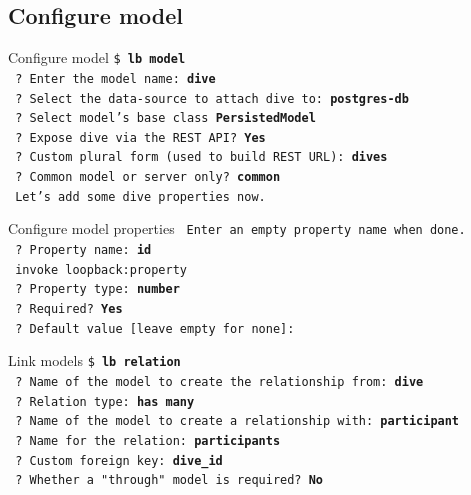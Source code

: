 \documentclass[11pt]{beamer}
\begin{document}
\subsection{Configure model}
\begin{frame}{Configure model}
\texttt{\$ \textbf{lb model}}\\
\texttt{ ? Enter the model name: \textbf{dive}}\\
\texttt{ ? Select the data-source to attach dive to: \textbf{postgres-db}}\\
\texttt{ ? Select model's base class \textbf{PersistedModel}}\\
\texttt{ ? Expose dive via the REST API? \textbf{Yes}}\\
\texttt{ ? Custom plural form (used to build REST URL): \textbf{dives}}\\
\texttt{ ? Common model or server only? \textbf{common}}\\
\texttt{ Let's add some dive properties now.}
\end{frame}
\begin{frame}{Configure model properties}
\texttt{    Enter an empty property name when done.}\\
\texttt{    ? Property name: \textbf{id}}\\
\texttt{       invoke   loopback:property}\\
\texttt{    ? Property type: \textbf{number}}\\
\texttt{    ? Required? \textbf{Yes}}\\
\texttt{    ? Default value [leave empty for none]: }
\end{frame}
\begin{frame}[fragile]{Link models}
\texttt{\$ \textbf{lb relation}}\\
\texttt{    ? Name of the model to create the relationship from:  \textbf{dive}}\\
\texttt{    ? Relation type: \textbf{has many}}\\
\texttt{    ? Name of the model to create a relationship with: \textbf{participant}}\\
\texttt{    ? Name for the relation: \textbf{participants}}\\
\texttt{    ? Custom foreign key: \textbf{dive\_id}}\\
\texttt{    ? Whether a "through" model is required? \textbf{No}}
\end{frame}
\end{document}

